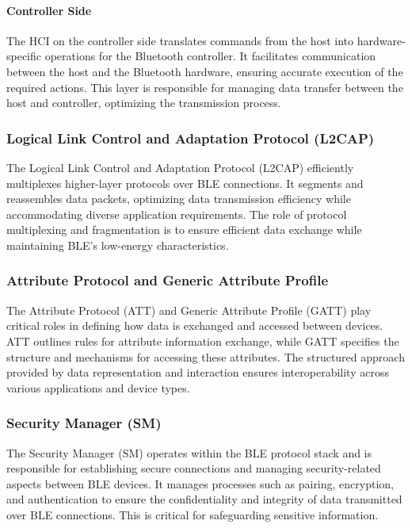 \paragraph{Controller Side}
The HCI on the controller side translates commands from the host into hardware-specific operations for the Bluetooth controller. It facilitates communication between the host and the Bluetooth hardware, ensuring accurate execution of the required actions. This layer is responsible for managing data transfer between the host and controller, optimizing the transmission process.


\subsubsection{Logical Link Control and Adaptation Protocol (L2CAP)}
The Logical Link Control and Adaptation Protocol (L2CAP) efficiently multiplexes higher-layer protocols over BLE connections. It segments and reassembles data packets, optimizing data transmission efficiency while accommodating diverse application requirements. The role of protocol multiplexing and fragmentation is to ensure efficient data exchange while maintaining BLE's low-energy characteristics.

\subsubsection{Attribute Protocol and Generic Attribute Profile}
The Attribute Protocol (ATT) and Generic Attribute Profile (GATT) play critical roles in defining how data is exchanged and accessed between devices. ATT outlines rules for attribute information exchange, while GATT specifies the structure and mechanisms for accessing these attributes. The structured approach provided by data representation and interaction ensures interoperability across various applications and device types.

\subsubsection{Security Manager (SM)}
The Security Manager (SM) operates within the BLE protocol stack and is responsible for establishing secure connections and managing security-related aspects between BLE devices. It manages processes such as pairing, encryption, and authentication to ensure the confidentiality and integrity of data transmitted over BLE connections. This is critical for safeguarding sensitive information.

